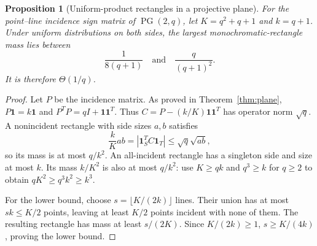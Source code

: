 \documentclass[11pt]{article}
\newtheorem{proposition}[theorem]{Proposition}
\newcommand{\1}{\mathbf 1}
\begin{document}
\begin{samepage}
\begin{proposition}[Uniform-product rectangles in a projective plane]\label{prop:pg-rect}
For the point--line incidence sign matrix of $\operatorname{PG}(2,q)$, let $K=q^2+q+1$ and $k=q+1$. Under uniform distributions on both sides, the largest monochromatic-rectangle mass lies between
\[
 \frac1{8(q+1)}\quad\text{and}\quad\frac{q}{(q+1)^2}.
\]
It is therefore $\Theta(1/q)$.
\end{proposition}
\end{samepage}
\begin{proof}
Let $P$ be the incidence matrix. As proved in Theorem~\ref{thm:plane}, $P\1=k\1$ and $P^TP=qI+\1\1^T$. Thus $C=P-(k/K)\1\1^T$ has operator norm $\sqrt q$. A nonincident rectangle with side sizes $a,b$ satisfies
\[
 \frac{k}{K}ab=|\1_S^TC\1_T|\le\sqrt q\sqrt{ab},
\]
so its mass is at most $q/k^2$. An all-incident rectangle has a singleton side and size at most $k$. Its mass $k/K^2$ is also at most $q/k^2$: use $K\ge qk$ and $q^3\ge k$ for $q\ge2$ to obtain $qK^2\ge q^3k^2\ge k^3$.

For the lower bound, choose $s=\lfloor K/(2k)\rfloor$ lines. Their union has at most $sk\le K/2$ points, leaving at least $K/2$ points incident with none of them. The resulting rectangle has mass at least $s/(2K)$. Since $K/(2k)\ge1$, $s\ge K/(4k)$, proving the lower bound.
\end{proof}

\end{document}
